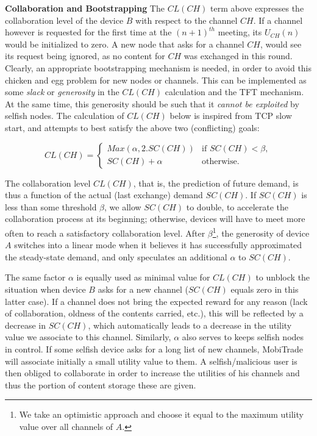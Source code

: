 \textbf{Collaboration and Bootstrapping}
The $CL(CH)$ term above expresses the collaboration level of the device $B$ with respect to the channel $CH$. If a channel however is requested for the first time at the $(n+1)^{th}$ meeting, its $U_{CH}(n)$ would be initialized to zero. A new node that asks for a channel $CH$, would see its request being ignored, as no content for $CH$ was exchanged in this round. Clearly, an appropriate bootstrapping mechanism is needed, in order to avoid this chicken and egg problem for new nodes or channels. This can be implemented as some \emph{slack} or \emph{generosity} in the $CL(CH)$ calculation and the TFT mechanism. At the same time, this generosity should be such that it \emph{cannot be exploited} by selfish nodes. The calculation of $CL(CH)$ below is inspired from TCP slow start, and attempts to best satisfy the above two (conflicting) goals:

$$
CL(CH) = \left\{
    \begin{array}{ll}
        Max(\alpha, 2 . SC(CH)) & \mbox{if } SC(CH) < \beta, \\
        SC(CH) + \alpha & \mbox{otherwise.}
    \end{array}
\right.
$$

The collaboration level $CL(CH)$, that is, the prediction of future demand, is thus a function of the actual (last exchange) demand $SC(CH)$. If $SC(CH)$ is less than some threshold $\beta$, we allow $SC(CH)$ to double, to accelerate the collaboration process at its beginning; otherwise, devices will have to meet more often to reach a satisfactory collaboration level. After $\beta$\footnote{We take an optimistic approach and choose it equal to the maximum utility value over all channels of $A$.}, the generosity of device $A$ switches into a linear mode when it believes it has successfully approximated the steady-state demand, and only speculates an additional $\alpha$ to $SC(CH)$.

The same factor $\alpha$ is equally used as minimal value for $CL(CH)$ to unblock the situation when device $B$ asks for a new channel ($SC(CH)$ equals zero in this latter case). If a channel does not bring the expected reward for any reason (lack of collaboration, oldness of the contents carried, etc.), this will be reflected by a decrease in $SC(CH)$, which automatically leads to a decrease in the utility value we associate to this channel. Similarly, $\alpha$ also serves to keeps selfish nodes in control. If some selfish device asks for a long list of new channels, MobiTrade will associate initially a small utility value to them. A selfish/malicious user is then obliged to collaborate in order to increase the utilities of his channels and thus the portion of content storage these are given.


